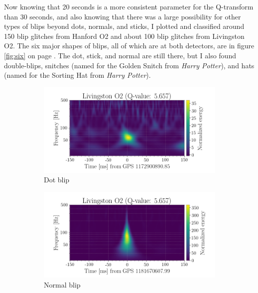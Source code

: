 \documentclass[a4paper]{article}
\begin{document}
Now knowing that 20 seconds is a more consistent parameter for the Q-transform than 30 seconds, and also knowing that there was a large possibility for other types of blips beyond dots, normals, and sticks, I plotted and classified around 150 blip glitches from Hanford O2 and about 100 blip glitches from Livingston O2. The six major shapes of blips, all of which are at both detectors, are in figure \ref{fig:six} on page \pageref{fig:six}. The dot, stick, and normal are still there, but I also found double-blips, snitches (named for the Golden Snitch from \textit{Harry Potter}), and hats (named for the Sorting Hat from \textit{Harry Potter}). 

\begin{figure}[h!]
	\centering
	\begin{subfigure}{.49\textwidth}
		\centering
		\includegraphics[width=1\linewidth]{dot_O2}
		\caption{Dot blip}
		\label{fig:dot_O2}
	\end{subfigure}
	\begin{subfigure}{.49\textwidth}
		\centering
		\includegraphics[width=1\linewidth]{normal_O2}
		\caption{Normal blip}
		\label{fig:normal_O2}
	\end{subfigure}
	\begin{subfigure}{.49\textwidth}

\end{subfigure}
\end{figure}
\end{document}
